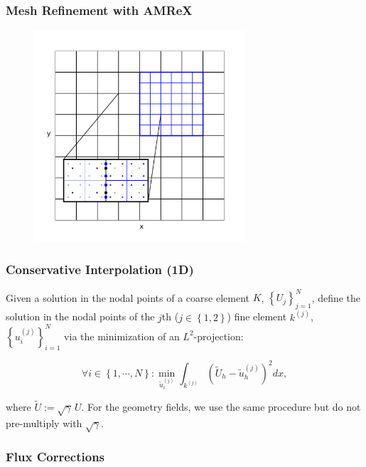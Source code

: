 \documentclass{beamer}
\begin{document}
\begin{frame}
\frametitle{Mesh Refinement with AMReX}

  \begin{figure}[htb!]
    \centering
    \includegraphics[width=0.7\textwidth]{fig.MeshRefinement_2D.png}
  \end{figure}

\end{frame}

\begin{frame}
\frametitle{Conservative Interpolation (1D)}

  Given a solution in the nodal points of a coarse element $K$,
  $\left\{U_{j}\right\}_{j=1}^{N}$,
  define the solution in the nodal points of the $j$th
  ($j\in\left\{1,2\right\}$)
  fine element $k^{\left(j\right)}$,
  $\left\{u_{i}^{\left(j\right)}\right\}_{i=1}^{N}$
  via the minimization of an $L^{2}$-projection:

  $$\forall i \in \left\{1,\cdots,N\right\}:
  \min\limits_{\tilde{u}_{i}^{\left(j\right)}}
  \int_{k^{\left(j\right)}}\left(\tilde{U}_{h}
  -\tilde{u}_{h}^{\left(j\right)}\right)^{2}dx,$$

  where $\tilde{U} := \sqrt{\gamma} \, U$.
  For the geometry fields, we use the same procedure but do not pre-multiply
  with $\sqrt{\gamma}$.

\end{frame}

\begin{frame}
\frametitle{Flux Corrections}

\end{frame}
\end{document}
